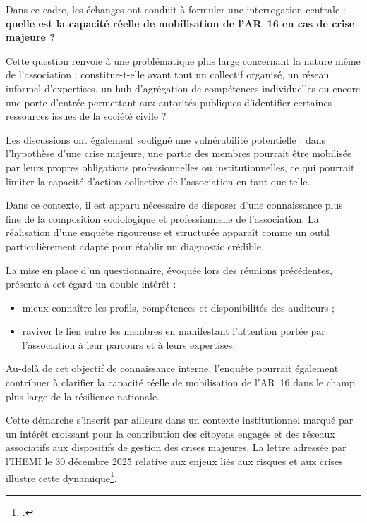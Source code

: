 \documentclass[12pt,a4paper]{article}
\begin{document}
Dans ce cadre, les échanges ont conduit à formuler une interrogation centrale :
\textbf{quelle est la capacité réelle de mobilisation de l'AR~16 en cas de crise majeure ?}

Cette question renvoie à une problématique plus large concernant la nature
même de l'association : constitue-t-elle avant tout un collectif organisé,
un réseau informel d'expertises, un hub d'agrégation de compétences
individuelles ou encore une porte d'entrée permettant aux autorités
publiques d'identifier certaines ressources issues de la société civile ?

Les discussions ont également souligné une vulnérabilité potentielle :
dans l'hypothèse d'une crise majeure, une partie des membres pourrait être
mobilisée par leurs propres obligations professionnelles ou institutionnelles,
ce qui pourrait limiter la capacité d'action collective de l'association
en tant que telle.

Dans ce contexte, il est apparu nécessaire de disposer d'une connaissance
plus fine de la composition sociologique et professionnelle de l'association.
La réalisation d'une enquête rigoureuse et structurée apparaît comme un
outil particulièrement adapté pour établir un diagnostic crédible.

La mise en place d'un questionnaire, évoquée lors des réunions précédentes,
présente à cet égard un double intérêt :

\begin{itemize}
    \item mieux connaître les profils, compétences et disponibilités des auditeurs ;
    \item raviver le lien entre les membres en manifestant l'attention portée
    par l'association à leur parcours et à leurs expertises.
\end{itemize}

Au-delà de cet objectif de connaissance interne, l'enquête pourrait également
contribuer à clarifier la capacité réelle de mobilisation de l'AR~16 dans le
champ plus large de la résilience nationale.

\newpage

Cette démarche s'inscrit par ailleurs dans un contexte institutionnel marqué
par un intérêt croissant pour la contribution des citoyens engagés et des
réseaux associatifs aux dispositifs de gestion des crises majeures. La lettre
adressée par l'IHEMI le 30 décembre 2025 relative aux enjeux liés aux risques
et aux crises illustre cette dynamique\footcite{IHEMI:2025:LIREC75}.
\end{document}
